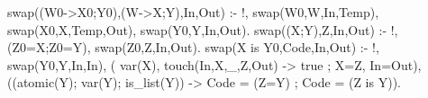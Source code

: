 swap((W0->X0;Y0),(W->X;Y),In,Out) :- !,
	swap(W0,W,In,Temp),
	swap(X0,X,Temp,Out),
	swap(Y0,Y,In,Out).
swap((X;Y),Z,In,Out) :- !,
	(Z0=X;Z0=Y),
	swap(Z0,Z,In,Out).
swap(X is Y0,Code,In,Out) :- !,
	swap(Y0,Y,In,In),
	(\+ var(X),
         touch(In,X,_,Z,Out)
         ->  true 
         ;   X=Z, In=Out),
	 ((atomic(Y); var(Y); is_list(Y))
         -> Code = (Z=Y)
         ;  Code = (Z is Y)).
